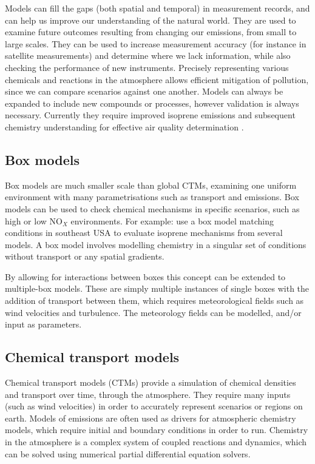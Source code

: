   Models can fill the gaps (both spatial and temporal) in measurement records, and can help us improve our understanding of the natural world.
  They are used to examine future outcomes resulting from changing our emissions, from small to large scales.
  They can be used to increase measurement accuracy (for instance in satellite measurements) and determine where we lack information, while also checking the performance of new instruments.
  Precisely representing various chemicals and reactions in the atmosphere allows efficient mitigation of pollution, since we can compare scenarios against one another.
  Models can always be expanded to include new compounds or processes, however validation is always necessary.
  Currently they require improved isoprene emissions and subsequent chemistry understanding for effective air quality determination \parencite{Marvin2017}.
  
  \subsection{Box models}
    Box models are much smaller scale than global CTMs, examining one uniform environment with many parametrisations such as transport and emissions.
    Box models can be used to check chemical mechanisms in specific scenarios, such as high or low NO$_X$ environments.
    For example: \textcite{Marvin2017} use a box model matching conditions in southeast USA to evaluate isoprene mechanisms from several models.  
    A box model involves modelling chemistry in a singular set of conditions without transport or any spatial gradients.
    
    By allowing for interactions between boxes this concept can be extended to multiple-box models.
    These are simply multiple instances of single boxes with the addition of transport between them, which requires meteorological fields such as wind velocities and turbulence.
    The meteorology fields can be modelled, and/or input as parameters.
  
  
  \subsection{Chemical transport models}
    \label{LR:Models:ctm}
    Chemical transport models (CTMs) provide a simulation of chemical densities and transport over time, through the atmosphere.
    They require many inputs (such as wind velocities) in order to accurately represent scenarios or regions on earth.
    Models of emissions are often used as drivers for atmospheric chemistry models, which require initial and boundary conditions in order to run.
    Chemistry in the atmosphere is a complex system of coupled reactions and dynamics, which can be solved using numerical partial differential equation solvers.
    
